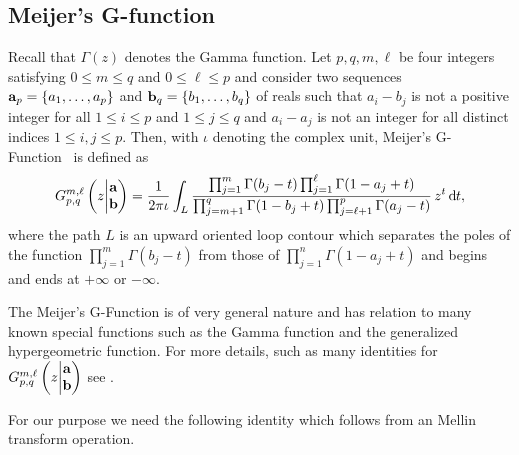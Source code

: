 \begin{appendices}

\section{Meijer's G-function}\label{sec:Meijer_G_functions}

Recall that $\Gamma(z)$ denotes the Gamma function. Let $p, q, m, \ell$ be four integers satisfying $0 \le m \le q$ and $0 \le \ell \le p$ and consider two sequences ${\bf a}_p = \{a_1, \dots, a_p\}$ and ${\bf b}_q = \{b_1, \dots, b_q\}$ of reals such that $a_i - b_j$ is not a positive integer for all $1 \le i \le p$ and $1 \le j \le q$ and $a_i - a_j$ is not an integer for all distinct indices $1 \le i, j \le p$. Then, with $\iota$ denoting the complex unit, Meijer's G-Function~\cite{meijer1946gfunction} is defined as
\begin{equation}\label{eq:def_Meijer_G_function}
	\MeijerGnew{m}{\ell}{p}{q}{{\bf a}}{{\bf b}}{z} 
	= \frac{1}{2 \pi \iota} \int_L 
	\frac{\prod_{j = 1}^{m}\Gamma(b_j - t) \prod_{j = 1}^\ell \Gamma(1 - a_j + t)}
	{\prod_{j = m + 1}^{q}\Gamma(1 - b_j + t) \prod_{j = \ell + 1}^p\Gamma(a_j-t)} \, z^t \dd t,
\end{equation}
where the path $L$ is an upward oriented loop contour which separates the poles of the function $\prod_{j = 1}^{m}\Gamma(b_j - t)$ from those of $\prod_{j = 1}^n \Gamma(1 - a_j + t)$ and begins and ends at $+\infty$ or $-\infty$.

The Meijer's G-Function is of very general nature and has relation to many known special functions such as the Gamma function and the generalized hypergeometric function. For more details, such as many identities for $\MeijerGnew{m}{\ell}{p}{q}{{\bf a}}{{\bf b}}{z}$ see \cite{gradshteyn2015table,luke2014mathematical}.

For our purpose we need the following identity which follows from an Mellin transform operation.


\end{appendices}
